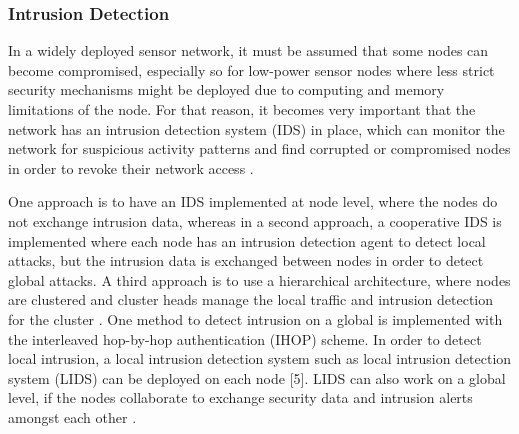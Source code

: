 \documentclass[12pt,a4paper,twoside]{report}
\begin{document}
\subsubsection{Intrusion Detection}
In a widely deployed sensor network, it must be assumed that some nodes can become compromised, especially so for low-power sensor nodes where less strict security mechanisms might be deployed due to computing and memory limitations of the node. For that reason, it becomes very important that the network has an intrusion detection system (IDS) in place, which can monitor the network for suspicious activity patterns and find corrupted or compromised nodes in order to revoke their network access \cite{sen:2009}.\par
One approach is to have an IDS implemented at node level, where the nodes do not exchange intrusion data, whereas in a second approach, a cooperative IDS is implemented where each node has an intrusion detection agent to detect local attacks, but the intrusion data is exchanged between nodes in order to detect global attacks. A third approach is to use a hierarchical architecture, where nodes are clustered and cluster heads manage the local traffic and intrusion detection for the cluster \cite{sen:2009}. One method to detect intrusion on a global is implemented with the interleaved hop-by-hop authentication (IHOP) scheme. In order to detect local intrusion, a local intrusion detection system such as local intrusion detection system (LIDS) can be deployed on each node [5]. LIDS can also work on a global level, if the nodes collaborate to exchange security data and intrusion alerts amongst each other \cite{sen:2009}.\par
\end{document}
